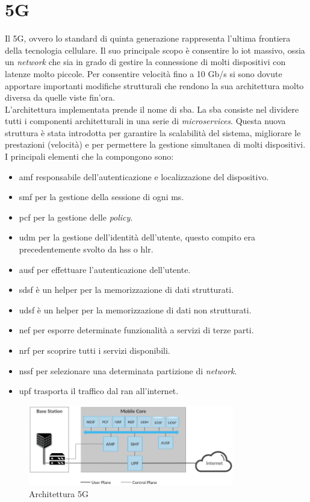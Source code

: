 \section{5G}
Il 5G, ovvero lo standard di quinta generazione rappresenta l'ultima frontiera della tecnologia cellulare.
Il suo principale scopo è consentire lo \gls{iot} massivo, ossia un \textit{network} che sia 
in grado di gestire la connessione di molti dispositivi con latenze molto piccole.
Per consentire velocità fino a 10 Gb/s si sono
dovute apportare importanti modifiche strutturali che rendono la sua architettura molto diversa da quelle viste fin'ora.\\
L'architettura implementata prende il nome di \gls{sba}.
La \gls{sba} consiste nel dividere tutti i componenti architetturali in una serie di \textit{microservices}\cite{5g-approach}. 
Questa nuova struttura è stata introdotta per garantire la scalabilità del sistema, migliorare le prestazioni (velocità) e per 
permettere la gestione simultanea di molti dispositivi.\\
I principali elementi che la compongono sono:
\begin{itemize}
    \item \gls{amf} responsabile dell'autenticazione e localizzazione del dispositivo.
    \item \gls{smf} per la gestione della sessione di ogni \gls{ms}.
    \item \gls{pcf} per la gestione delle \textit{policy}.
    \item \gls{udm} per la gestione dell'identità dell'utente, questo compito era precedentemente svolto da \gls{hss} o \gls{hlr}.
    \item \gls{ausf} per effettuare l'autenticazione dell'utente.
    \item \gls{sdsf} è un helper per la memorizzazione di dati strutturati.
    \item \gls{udsf} è un helper per la memorizzazione di dati non strutturati.
    \item \gls{nef} per esporre determinate funzionalità a servizi di terze parti.
    \item \gls{nrf} per scoprire tutti i servizi disponibili.
    \item \gls{nssf} per selezionare una determinata partizione di \textit{network}.
    \item \gls{upf} trasporta il traffico dal \gls{ran} all'internet.
\end{itemize}
\begin{figure}[ht]
    \centering
    \includegraphics[width=0.8\textwidth]{images/5g-planes.png}
    \caption{Architettura 5G\cite{5g-approach}}
\end{figure}


